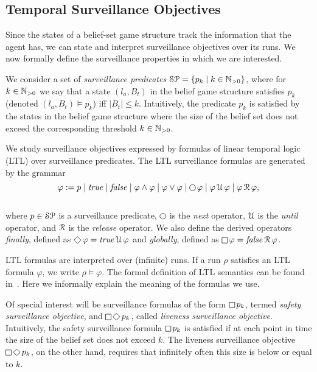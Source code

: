 \subsection{Temporal Surveillance Objectives}
Since the states of a belief-set game structure track the information that the agent has, we can state and interpret surveillance objectives over its runs. We now formally define the surveillance properties in which we are interested. 

We consider a set of \emph{surveillance predicates} $\mathcal{SP} = \{p_k \mid k \in \mathbb{N}_{>0}\}$, where for $k \in \mathbb{N}_{>0}$ we say that a state $(l_a,B_t)$ in the belief game structure satisfies $p_k$ (denoted $(l_a,B_t) \models p_k$) iff 
$|B_t| \leq k$. Intuitively, the predicate $p_k$ is satisfied by the states in the belief game structure where the size of the belief set does not exceed the corresponding threshold $k \in \mathbb{N}_{>0}$.

We study surveillance objectives expressed by formulas of linear temporal logic (LTL) over surveillance predicates.
 The LTL surveillance formulas  are generated by the grammar\\
\[\varphi := p \mid \true \mid \false \mid \varphi \wedge \varphi \mid \varphi \vee \varphi \mid \LTLnext  \varphi  \mid \varphi \LTLuntil \varphi \mid \varphi \LTLrelease \varphi,\]\\
where $p \in \mathcal{SP}$ is a surveillance predicate, $\LTLnext$ is the \emph{next} operator, $\operatorname{\mathcal{U}}$ is the \emph{until} operator, and $\operatorname{\mathcal{R}}$ is the \emph{release} operator. We also define the derived operators 
\emph{finally}, defined as $\LTLfinally \varphi = \true \LTLuntil \varphi$ and 
\emph{globally}, defined as $\LTLglobally \varphi = \false \LTLrelease \varphi$.

LTL formulas are interpreted over (infinite) runs. If a run $\rho$ satisfies an LTL formula $\varphi$, we write $\rho \models \varphi$. The formal definition of LTL semantics can be found in~\cite{BaierKatoen08}. Here we informally explain the meaning of the formulas we use.

Of special interest will be surveillance formulas of the form $\LTLglobally p_k$, termed \emph{safety surveillance objective}, and $\LTLglobally\LTLfinally p_k$, called \emph{liveness surveillance objective}.
Intuitively, the safety surveillance formula $\LTLglobally p_k$ is satisfied if at each point in time the size of the belief set does not exceed $k$. The liveness surveillance objective $\LTLglobally\LTLfinally p_k$, on the other hand, requires that infinitely often this size is below or equal to $k$.


